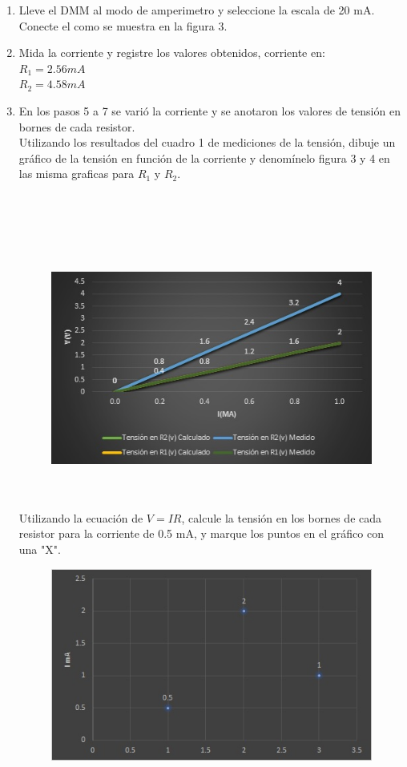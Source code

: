 \begin{enumerate}
	\item Lleve  el DMM al modo de amperimetro y seleccione la escala de 20 mA. Conecte el  como se muestra en la figura 3.
	\item Mida la corriente y registre los valores obtenidos, corriente en:
	\\$R_{1}= 2.56 mA$
	\\$R_{2}= 4.58 mA$
	\item En los pasos 5 a 7 se varió la corriente y se anotaron los valores de tensión en bornes de cada resistor.
	\\ Utilizando los resultados del cuadro 1 de mediciones de la tensión, dibuje un gráfico de la tensión en función de la corriente y denomínelo figura 3 y 4 en las misma graficas para $R_{1}$ y $R_{2}$.
	\\
	\\
	\\
	\\
	\\
	\\
	\begin{figure}[h]
		\centering
		\includegraphics[scale=1]{imagenes/1}
	\end{figure}
	\\
	\\
	Utilizando la ecuación de $V=IR$, calcule la tensión en los bornes de cada resistor para la corriente de 0.5 mA, y marque los puntos en el gráfico con una "X".
	\begin{figure}[h]
		\centering
		\includegraphics[scale=1]{imagenes/2}

\end{figure}
\end{enumerate}
